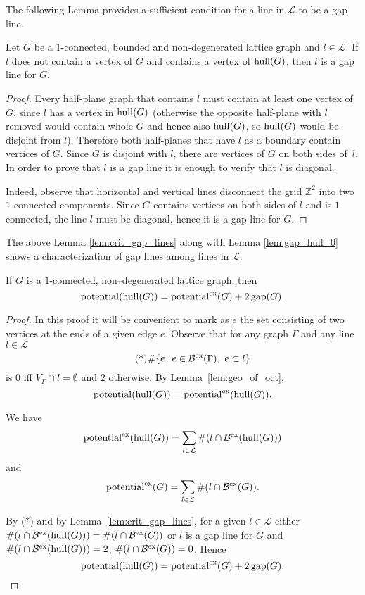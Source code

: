 The following Lemma provides a sufficient condition  for a line in ${\mathcal L}$ to be a gap line. 
\begin{lemma}
  Let $G$ be a $1$-connected, bounded and non-degenerated lattice graph and $l \in \mathcal{L}$.
  If $l$ does not contain a vertex of $G$
     and contains a vertex of $\operatorname{hull}(G)$,
     then $l$ is a gap line for $G$.
     \label{lem:crit_gap_lines}
\end{lemma}
\begin{proof}
  Every half-plane graph that contains $l$ must contain at least one vertex of $G$, since $l$ has a vertex in $\operatorname{hull}(G)$ (otherwise the opposite half-plane with $l$ removed would contain whole $G$ and hence also $\operatorname{hull}(G)$, so $\operatorname{hull}(G)$ would be disjoint from $l$).
Therefore both half-planes that have $l$ as a boundary contain vertices of $G$.  
Since $G$ is disjoint with $l$, there are vertices of $G$ on both sides of~$l$.
In order to prove that $l$ is a gap line it is enough to verify that $l$ is diagonal.

Indeed, observe that horizontal and vertical lines disconnect the grid $\mathbb{Z}^2$ into two $1$-connected components. Since $G$ contains vertices on both sides of $l$ and is $1$-connected, the line $l$ must be diagonal, hence it is a gap line for $G$.
\end{proof}

The above Lemma \ref{lem:crit_gap_lines} along with Lemma \ref{lem:gap_hull_0} shows a characterization of gap lines among lines in ${\mathcal L}$. 

\begin{lemma}\label{def:diagonal-gaps}
If $G$ is a $1$-connected, non--degenerated lattice graph, then 
  \[ \operatorname{potential}(\operatorname{hull}(G)) = \operatorname{potential}^{\operatorname{ex}}(G)+2\operatorname{gap}(G).\] 
\end{lemma}

\begin{proof}
In this proof it will be convenient to mark as  $\overline{e}$ the set consisting of two vertices at the ends of a given edge $e$. 
Observe that for any graph $\Gamma$ and any line $l \in \mathcal{L}$
\[
\tag{*}
  \# \{ \overline{e}  \colon e\in \mathcal{B}^{\external}(\Gamma),\ \overline{e} \subset l \}
\]
is $0$ iff $V_\Gamma \cap l = \emptyset$ and $2$ otherwise.
By Lemma~\ref{lem:geo_of_oct},
\[
  \operatorname{potential}(\operatorname{hull}(G)) = \operatorname{potential}^{\operatorname{ex}}(\operatorname{hull}(G)).
\]

We have
\[
\operatorname{potential}^{\operatorname{ex}} (\operatorname{hull}(G)) =  \sum_{l \in \mathcal{L}} \# (l \cap \mathcal{B}^{\operatorname{ex}}(\operatorname{hull}(G)))
\]
and%
\[
  \operatorname{potential}^{\operatorname{ex}} (G) = \sum_{l \in \mathcal{L}} \# (l \cap \mathcal{B}^{\operatorname{ex}}(G)).
\]

By (*) and by Lemma~\ref{lem:crit_gap_lines}, for a given $l\in{\mathcal L}$ either
  $\# (l \cap \mathcal{B}^{\operatorname{ex}}(\operatorname{hull}(G))) =
  \# (l \cap \mathcal{B}^{\operatorname{ex}}(G))
  $
or
  $l$ is a gap line for $G$ and $\# (l \cap \mathcal{B}^{\operatorname{ex}}(\operatorname{hull}(G))) = 2$, $\# (l \cap \mathcal{B}^{\operatorname{ex}}(G)) = 0$. Hence
    \[ \operatorname{potential}(\operatorname{hull}(G)) = \operatorname{potential}^{\operatorname{ex}}(G)+2\operatorname{gap}(G).\] 
\end{proof}
 
